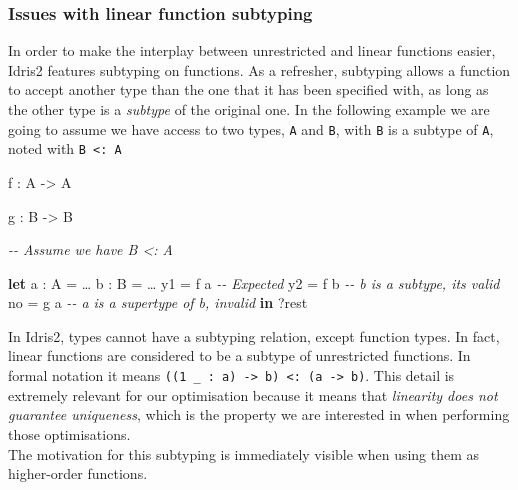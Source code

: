 \documentclass[
]{article}
\newenvironment{Shaded}{}{}
\newcommand{\CommentTok}[1]{\textcolor[rgb]{0.38,0.63,0.69}{\textit{#1}}}
\newcommand{\DataTypeTok}[1]{\textcolor[rgb]{0.56,0.13,0.00}{#1}}
\newcommand{\KeywordTok}[1]{\textcolor[rgb]{0.00,0.44,0.13}{\textbf{#1}}}
\newcommand{\NormalTok}[1]{#1}
\newcommand{\OperatorTok}[1]{\textcolor[rgb]{0.40,0.40,0.40}{#1}}
\newcommand{\OtherTok}[1]{\textcolor[rgb]{0.00,0.44,0.13}{#1}}
\begin{document}
\hypertarget{issues-with-linear-function-subtyping}{%
\subsubsection{Issues with linear function
subtyping}\label{issues-with-linear-function-subtyping}}

In order to make the interplay between unrestricted and linear functions
easier, Idris2 features subtyping on functions. As a refresher,
subtyping allows a function to accept another type than the one that it
has been specified with, as long as the other type is a \emph{subtype}
of the original one. In the following example we are going to assume we
have access to two types, \texttt{A} and \texttt{B}, with \texttt{B} is
a subtype of \texttt{A}, noted with \texttt{B\ \textless{}:\ A}

\begin{Shaded}
\begin{Highlighting}[]

\NormalTok{f }\OperatorTok{:} \DataTypeTok{A} \OtherTok{{-}\textgreater{}} \DataTypeTok{A}

\NormalTok{g }\OperatorTok{:} \DataTypeTok{B} \OtherTok{{-}\textgreater{}} \DataTypeTok{B}

\CommentTok{{-}{-} Assume we have B \textless{}: A}

\KeywordTok{let}\NormalTok{ a }\OperatorTok{:} \DataTypeTok{A} \OtherTok{=}\NormalTok{ …}
\NormalTok{    b }\OperatorTok{:} \DataTypeTok{B} \OtherTok{=}\NormalTok{ … }
\NormalTok{    y1 }\OtherTok{=}\NormalTok{ f a }\CommentTok{{-}{-} Expected}
\NormalTok{    y2 }\OtherTok{=}\NormalTok{ f b }\CommentTok{{-}{-} b is a subtype, it\textquotesingle{}s valid}
\NormalTok{    no }\OtherTok{=}\NormalTok{ g a }\CommentTok{{-}{-} a is a supertype of b, invalid}
 \KeywordTok{in} \OperatorTok{?}\NormalTok{rest}
\end{Highlighting}
\end{Shaded}

In Idris2, types cannot have a subtyping relation, except function
types. In fact, linear functions are considered to be a subtype of
unrestricted functions. In formal notation it means
\texttt{((1\ \_\ :\ a)\ -\textgreater{}\ b)\ \textless{}:\ (a\ -\textgreater{}\ b)}.
This detail is extremely relevant for our optimisation because it means
that \emph{linearity does not guarantee uniqueness}, which is the
property we are interested in when performing those optimisations.\\
The motivation for this subtyping is immediately visible when using them
as higher-order functions.
\end{document}
